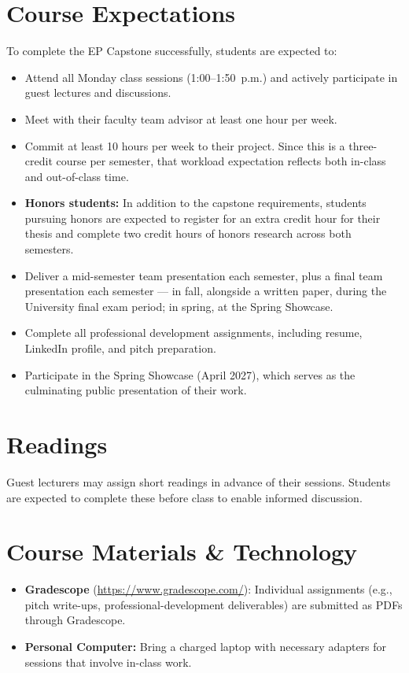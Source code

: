\documentclass[11pt, letterpaper]{article}
\begin{document}
\section{Course Expectations}
To complete the EP Capstone successfully, students are expected to:
\begin{itemize}
    \item Attend all Monday class sessions (1:00--1:50~p.m.) and actively participate in guest lectures and discussions.
    \item Meet with their faculty team advisor at least one hour per week.
    \item Commit at least 10 hours per week to their project. Since this is a three-credit course per semester, that workload expectation reflects both in-class and out-of-class time.
    \item \textbf{Honors students:} In addition to the capstone requirements, students pursuing honors are expected to register for an extra credit hour for their thesis and complete two credit hours of honors research across both semesters.
    \item Deliver a mid-semester team presentation each semester, plus a final team presentation each semester --- in fall, alongside a written paper, during the University final exam period; in spring, at the Spring Showcase.
    \item Complete all professional development assignments, including resume, LinkedIn profile, and pitch preparation.
    \item Participate in the Spring Showcase (April 2027), which serves as the culminating public presentation of their work.
\end{itemize}

\section{Readings}
Guest lecturers may assign short readings in advance of their sessions. Students are expected to complete these before class to enable informed discussion.

\section{Course Materials \& Technology}
\begin{itemize}
    \item \textbf{Gradescope} (\url{https://www.gradescope.com/}): Individual assignments (e.g., pitch write-ups, professional-development deliverables) are submitted as PDFs through Gradescope.
    \item \textbf{Personal Computer:} Bring a charged laptop with necessary adapters for sessions that involve in-class work.
\end{itemize}
\end{document}

